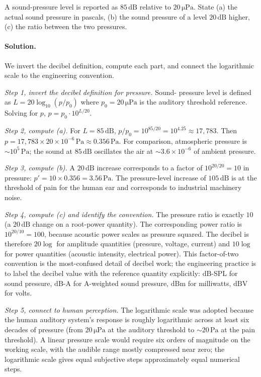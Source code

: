 \begin{exercise}
A sound-pressure level is reported as $85 \,\si{\deci\bel}$ relative
to $20 \,\si{\micro\pascal}$. State (a) the actual sound pressure in
pascals, (b) the sound pressure of a level $20 \,\si{\deci\bel}$
higher, (c) the ratio between the two pressures.

\paragraph{Solution.}
We invert the decibel definition, compute each part, and connect the
logarithmic scale to the engineering convention.

\textit{Step 1, invert the decibel definition for pressure.} Sound-
pressure level is defined as
$L = 20 \log_{10}(p/p_{0})$ where $p_{0} = 20 \,\si{\micro\pascal}$
is the auditory threshold reference. Solving for $p$,
$p = p_{0} \cdot 10^{L/20}$.

\textit{Step 2, compute (a).} For $L = 85 \,\si{\deci\bel}$,
$p/p_{0} = 10^{85/20} = 10^{4.25} \approx 17{,}783$. Then
$p = 17{,}783 \times 20 \times 10^{-6} \,\si{\pascal} \approx 0.356
\,\si{\pascal}$. For comparison, atmospheric pressure is
$\sim 10^{5} \,\si{\pascal}$; the sound at $85 \,\si{\deci\bel}$
oscillates the air at $\sim 3.6 \times 10^{-6}$ of ambient pressure.

\textit{Step 3, compute (b).} A $20 \,\si{\deci\bel}$ increase
corresponds to a factor of $10^{20/20} = 10$ in pressure:
$p' = 10 \times 0.356 = 3.56 \,\si{\pascal}$. The pressure-level
increase of $105 \,\si{\deci\bel}$ is at the threshold of pain for
the human ear and corresponds to industrial machinery noise.

\textit{Step 4, compute (c) and identify the convention.} The
pressure ratio is exactly $10$ (a $20\,\si{\deci\bel}$ change on a
root-power quantity). The corresponding power ratio is
$10^{20/10} = 100$, because acoustic power scales as pressure
squared. The decibel is therefore $20 \log$ for amplitude quantities
(pressure, voltage, current) and $10 \log$ for power quantities
(acoustic intensity, electrical power). This factor-of-two
convention is the most-confused detail of decibel work; the
engineering practice is to label the decibel value with the
reference quantity explicitly: $\si{\deci\bel}$-SPL for sound
pressure, $\si{\deci\bel}$-A for A-weighted sound pressure,
$\si{\deci\bel}$m for milliwatts, $\si{\deci\bel}$V for volts.

\textit{Step 5, connect to human perception.} The logarithmic scale
was adopted because the human auditory system's response is roughly
logarithmic across at least six decades of pressure (from $20
\,\si{\micro\pascal}$ at the auditory threshold to $\sim 20
\,\si{\pascal}$ at the pain threshold). A linear pressure scale
would require six orders of magnitude on the working scale, with
the audible range mostly compressed near zero; the logarithmic
scale gives equal subjective steps approximately equal numerical
steps.


\end{exercise}
